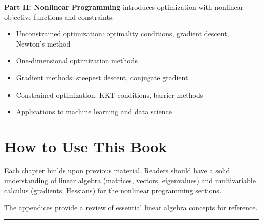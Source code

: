 \textbf{Part II: Nonlinear Programming} introduces optimization with nonlinear objective functions and constraints:
\begin{itemize}
    \item Unconstrained optimization: optimality conditions, gradient descent, Newton's method
    \item One-dimensional optimization methods
    \item Gradient methods: steepest descent, conjugate gradient
    \item Constrained optimization: KKT conditions, barrier methods
    \item Applications to machine learning and data science
\end{itemize}

\section*{How to Use This Book}

Each chapter builds upon previous material. Readers should have a solid understanding of linear algebra (matrices, vectors, eigenvalues) and multivariable calculus (gradients, Hessians) for the nonlinear programming sections.

The appendices provide a review of essential linear algebra concepts for reference.

\vspace{1cm}
\begin{center}
\rule{0.5\textwidth}{0.4pt}
\end{center}

